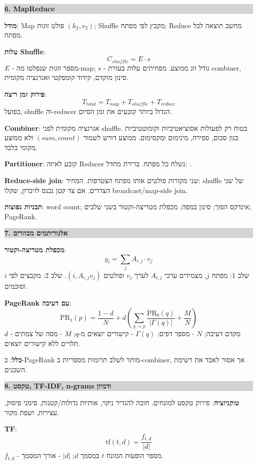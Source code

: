 \documentclass[10pt,a4paper]{article}
\newcommand{\eng}[1]{\textenglish{#1}}
\newcommand{\code}[1]{\textenglish{\texttt{\detokenize{#1}}}}
\newcommand{\term}[1]{\textbf{#1}}
\newcommand{\formula}[1]{\[
#1
\]}
\newenvironment{cheatbox}[1]{
  \vspace{2pt}
  \noindent\colorbox{lightgray}{\parbox{\dimexpr\linewidth-2\fboxsep}{\textbf{\color{sectionblue}#1}}}
  \vspace{2pt}
}{\vspace{3pt}}
\begin{document}
\begin{multicols}{2}
\begin{cheatbox}{6. \eng{MapReduce}}
\term{מודל}: \eng{Map} פולט זוגות $(k_2,v_2)$; \eng{Shuffle} מקבץ לפי מפתח; \eng{Reduce} מחשב תוצאה לכל מפתח.

\term{עלות \eng{Shuffle}}:
\formula{C_{shuffle}=E\cdot s}
$E$ - מספר זוגות שנפלטו מה-\eng{map}; $s$ - גודל זוג ממוצע. מפחיתים עלות בעזרת \eng{combiner}, סינון מוקדם, קידוד קומפקטי ואגרגציה מקומית.

\term{פירוק זמן ריצה}:
\formula{T_{total}=T_{map}+T_{shuffle}+T_{reduce}}
בפועל, \eng{shuffle} וה-\eng{reducer} הגדול ביותר קובעים את זמן הסיום.

\term{\eng{Combiner}}: אגרגציה מקומית לפני \eng{shuffle}. בטוח רק לפעולות אסוציאטיביות וקומוטטיביות כגון סכום, ספירה, מינימום ומקסימום. ממוצע דורש לשמור $(sum,count)$ ולא ממוצע מקומי בלבד.

\term{\eng{Partitioner}}: קובע לאיזה \eng{Reducer} נשלח כל מפתח. ברירת מחדל: \code{hash(key) mod R}.

\term{\eng{Reduce-side join}}: שני מקורות פולטים אותו מפתח הצטרפות. המחיר: \eng{shuffle} של שני הצדדים. אם צד קטן נכנס לזיכרון, שקלו \eng{broadcast/map-side join}.

\term{תבניות נפוצות}: \eng{word count}; אינדקס הפוך; סינון במפה; מכפלת מטריצה-וקטור בשני שלבים; \eng{PageRank}.
\end{cheatbox}

\begin{cheatbox}{7. אלגוריתמים מבוזרים}
\term{מכפלת מטריצה-וקטור}:
\formula{y_i=\sum_j A_{i,j}\cdot v_j}
שלב 1: מפתח $j$, מצמידים ערכי $A_{i,j}$ לערך $v_j$ ופולטים $(i,A_{i,j}v_j)$. שלב 2: מקבצים לפי $i$ וסוכמים.

\term{\eng{PageRank} עם דעיכה}:
\formula{\mathrm{PR}_1(p)=\frac{1-d}{N}+d\left(\sum_{q\to p}\frac{\mathrm{PR}_0(q)}{|\Gamma(q)|}+\frac{M}{N}\right)}
$d$ - מקדם דעיכה; $N$ - מספר דפים; $\Gamma(q)$ - קישורים יוצאים מ-$q$; $M$ - מסה של צמתים תלויים ללא קישורים יוצאים.

\term{כלל}: ב-\eng{PageRank} מותר לשלב תרומות מספריות ב-\eng{combiner}, אך אסור לאבד את רשימת השכנים.
\end{cheatbox}

\begin{cheatbox}{8. טקסט, \eng{TF-IDF}, \eng{n-grams} ודמיון}
\term{טוקניזציה}: פירוק טקסט למונחים. חובה להגדיר ניקוי, אותיות גדולות/קטנות, סימני פיסוק, עצירות, ושפת מקור.

\term{\eng{TF}}:
\formula{\text{tf}(t,d)=\frac{f_{t,d}}{|d|}}
$f_{t,d}$ - מספר הופעות המונח $t$ במסמך $d$; $|d|$ - אורך המסמך.


\end{cheatbox}
\end{multicols}
\end{document}
